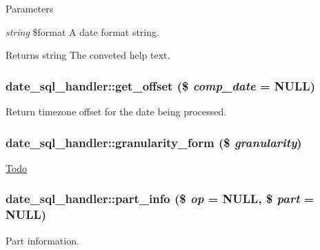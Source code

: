 \begin{DoxyParams}{Parameters}
\item[{\em string}]\$format A date format string.\end{DoxyParams}
\begin{DoxyReturn}{Returns}
string The conveted help text. 
\end{DoxyReturn}
\hypertarget{classdate__sql__handler_a4c0829b7a4ab472cb070c19e1608dc7a}{
\subsubsection[{get\_\-offset}]{\setlength{\rightskip}{0pt plus 5cm}date\_\-sql\_\-handler::get\_\-offset (\$ {\em comp\_\-date} = {\ttfamily NULL})}}
\label{classdate__sql__handler_a4c0829b7a4ab472cb070c19e1608dc7a}
Return timezone offset for the date being processed. \hypertarget{classdate__sql__handler_add4b2f59b4d1da58336ffa0afcd97f03}{
\subsubsection[{granularity\_\-form}]{\setlength{\rightskip}{0pt plus 5cm}date\_\-sql\_\-handler::granularity\_\-form (\$ {\em granularity})}}
\label{classdate__sql__handler_add4b2f59b4d1da58336ffa0afcd97f03}
\begin{Desc}
\item[\hyperlink{todo__todo000052}{Todo}]\end{Desc}
\hypertarget{classdate__sql__handler_a867091165b26b483cbf7301978871d26}{
\subsubsection[{part\_\-info}]{\setlength{\rightskip}{0pt plus 5cm}date\_\-sql\_\-handler::part\_\-info (\$ {\em op} = {\ttfamily NULL}, \/  \$ {\em part} = {\ttfamily NULL})}}
\label{classdate__sql__handler_a867091165b26b483cbf7301978871d26}
Part information.


